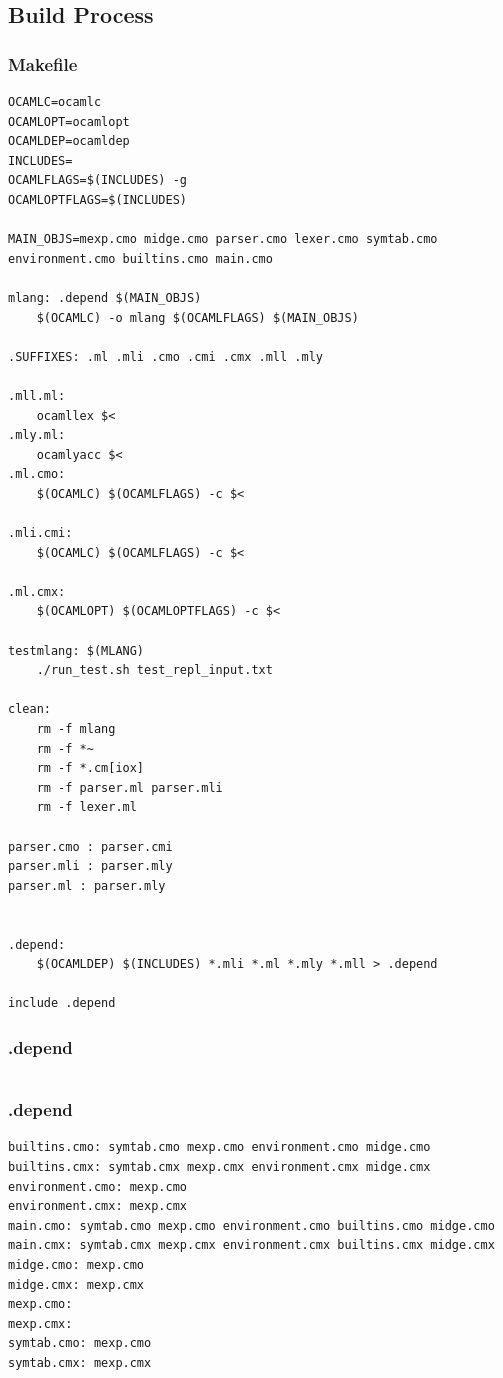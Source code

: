 \documentclass[letterpaper,11pt]{article}
\begin{document}
{\subsection{Build Process}
\lstset{language=bash}
\subsubsection{Makefile}
\begin{lstlisting}
OCAMLC=ocamlc
OCAMLOPT=ocamlopt
OCAMLDEP=ocamldep
INCLUDES=
OCAMLFLAGS=$(INCLUDES) -g
OCAMLOPTFLAGS=$(INCLUDES)

MAIN_OBJS=mexp.cmo midge.cmo parser.cmo lexer.cmo symtab.cmo environment.cmo builtins.cmo main.cmo

mlang: .depend $(MAIN_OBJS)
	$(OCAMLC) -o mlang $(OCAMLFLAGS) $(MAIN_OBJS)

.SUFFIXES: .ml .mli .cmo .cmi .cmx .mll .mly

.mll.ml:
	ocamllex $<
.mly.ml:
	ocamlyacc $<
.ml.cmo:
	$(OCAMLC) $(OCAMLFLAGS) -c $<

.mli.cmi:
	$(OCAMLC) $(OCAMLFLAGS) -c $<

.ml.cmx:
	$(OCAMLOPT) $(OCAMLOPTFLAGS) -c $<

testmlang: $(MLANG)
	./run_test.sh test_repl_input.txt

clean:
	rm -f mlang
	rm -f *~
	rm -f *.cm[iox]
	rm -f parser.ml parser.mli
	rm -f lexer.ml

parser.cmo : parser.cmi
parser.mli : parser.mly
parser.ml : parser.mly


.depend:
	$(OCAMLDEP) $(INCLUDES) *.mli *.ml *.mly *.mll > .depend

include .depend
\end{lstlisting}

\subsubsection{.depend}
\begin{lstlisting}
\end{lstlisting}

\subsubsection{.depend}
\lstset{language=bash}
\begin{lstlisting}
builtins.cmo: symtab.cmo mexp.cmo environment.cmo midge.cmo
builtins.cmx: symtab.cmx mexp.cmx environment.cmx midge.cmx
environment.cmo: mexp.cmo
environment.cmx: mexp.cmx
main.cmo: symtab.cmo mexp.cmo environment.cmo builtins.cmo midge.cmo
main.cmx: symtab.cmx mexp.cmx environment.cmx builtins.cmx midge.cmx
midge.cmo: mexp.cmo
midge.cmx: mexp.cmx
mexp.cmo:
mexp.cmx:
symtab.cmo: mexp.cmo
symtab.cmx: mexp.cmx
\end{lstlisting}

}
\end{document}
